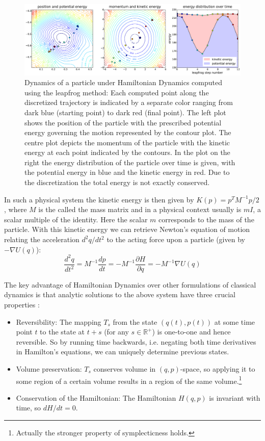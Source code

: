 \begin{figure}
\centering
\includegraphics[width=2.05\columnwidth]{figures/hmc_motion_1hmc_12lf.pdf}
\caption{Dynamics of a particle under Hamiltonian Dynamics computed using the leapfrog method: Each computed point along the discretized trajectory is indicated by a separate color ranging from dark blue (starting point) to dark red (final point). The left plot shows the position of the particle with the prescribed potential energy governing the motion represented by the contour plot. The centre plot depicts the momentum of the particle with the kinetic energy at each point indicated by the contours. In the plot on the right the energy distribution of the particle over time is given, with the potential energy in blue and the kinetic energy in red. Due to the discretization the total energy is not exactly conserved.}
\label{fig:HMC_MOTION_1hmc_12lf}
\end{figure}

In such a physical system the kinetic energy is then given by $K(p) = p^T M^{-1} p /2$, where $M$ is the called the mass matrix and in a physical context usually is $m I$, a scalar multiple of the identity. Here the scalar $m$ corresponds to the mass of the particle. With this kinetic energy we can retrieve Newton's equation of motion relating the acceleration $d^2q/dt^2$ to the acting force upon a particle (given by $-\nabla U(q)$):
\begin{equation} \label{eq:NewtonsEquation}
\frac{d^2q}{dt^2} = M^{-1} \frac{dp}{dt} = - M^{-1} \frac{\partial H}{\partial q} = - M^{-1} \nabla U(q)
\end{equation}

The key advantage of Hamiltonian Dynamics over other formulations of classical dynamics is that analytic solutions to the above system have three crucial properties \parencite{Neal2011}:
\begin{itemize}
\item Reversibility: The mapping $T_s$ from the state $(q(t), p(t))$ at some time point $t$ to the state at $t+s$ (for any $s \in \mathbb{R^+}$) is one-to-one and hence reversible. So by running time backwards, i.e. negating both time derivatives in Hamilton's equations, we can uniquely determine previous states.
\item Volume preservation: $T_s$ conserves volume in $(q, p)$-space, so applying it to some region of a certain volume results in a region of the same volume.\footnote{Actually the stronger property of symplecticness holds.}
\item Conservation of the Hamiltonian: The Hamiltonian $H(q, p)$ is invariant with time, so $dH/dt = 0$.
\end{itemize}

